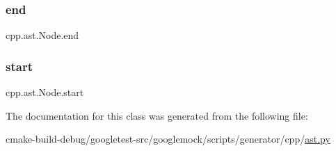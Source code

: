 \subsubsection{\texorpdfstring{end}{end}}
{\footnotesize\ttfamily cpp.\+ast.\+Node.\+end}

\mbox{\label{classcpp_1_1ast_1_1Node_a7b2aa97e6a049bb1a93aea48c48f1f44}} 
\subsubsection{\texorpdfstring{start}{start}}
{\footnotesize\ttfamily cpp.\+ast.\+Node.\+start}



The documentation for this class was generated from the following file\+:\begin{DoxyCompactItemize}
\item 
cmake-\/build-\/debug/googletest-\/src/googlemock/scripts/generator/cpp/\mbox{\hyperlink{ast_8py}{ast.\+py}}\end{DoxyCompactItemize}
